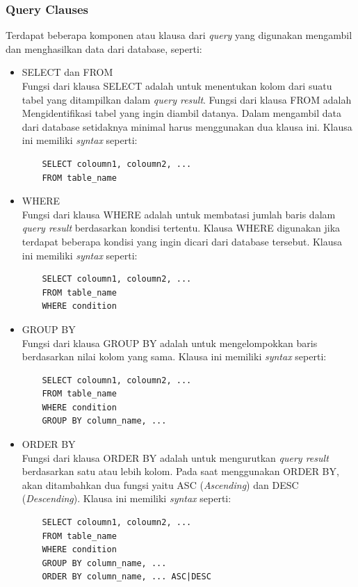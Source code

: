 \subsubsection{Query Clauses}
Terdapat beberapa komponen atau klausa dari \textit{query} yang digunakan mengambil dan menghasilkan data dari database, seperti:
\begin{itemize}
    \item SELECT dan FROM\\
    Fungsi dari klausa SELECT adalah untuk menentukan kolom dari suatu tabel yang ditampilkan dalam \textit{query result}. Fungsi dari klausa FROM adalah Mengidentifikasi tabel yang ingin diambil datanya. Dalam mengambil data dari database setidaknya minimal harus menggunakan dua klausa ini. Klausa ini memiliki \textit{syntax} seperti:
    \begin{verbatim}
    SELECT coloumn1, coloumn2, ...
    FROM table_name
    \end{verbatim}
    
    \item WHERE\\
    Fungsi dari klausa WHERE adalah untuk membatasi jumlah baris dalam \textit{query result} berdasarkan kondisi tertentu. Klausa WHERE digunakan jika terdapat beberapa kondisi yang ingin dicari dari database tersebut. Klausa ini memiliki \textit{syntax} seperti:
    \begin{verbatim}
    SELECT coloumn1, coloumn2, ...
    FROM table_name
    WHERE condition
\end{verbatim}
    
    \item GROUP BY\\
    Fungsi dari klausa GROUP BY adalah untuk mengelompokkan baris berdasarkan nilai kolom yang sama. Klausa ini memiliki \textit{syntax} seperti:
    \begin{verbatim}
    SELECT coloumn1, coloumn2, ...
    FROM table_name
    WHERE condition
    GROUP BY column_name, ...
\end{verbatim}
    
    \item ORDER BY\\
    Fungsi dari klausa ORDER BY adalah untuk mengurutkan \textit{query result} berdasarkan satu atau lebih kolom. Pada saat menggunakan ORDER BY, akan ditambahkan dua fungsi yaitu ASC (\textit{Ascending}) dan DESC (\textit{Descending}). Klausa ini memiliki \textit{syntax} seperti:
    \begin{verbatim}
    SELECT coloumn1, coloumn2, ...
    FROM table_name
    WHERE condition
    GROUP BY column_name, ...
    ORDER BY column_name, ... ASC|DESC
\end{verbatim}
\end{itemize}



